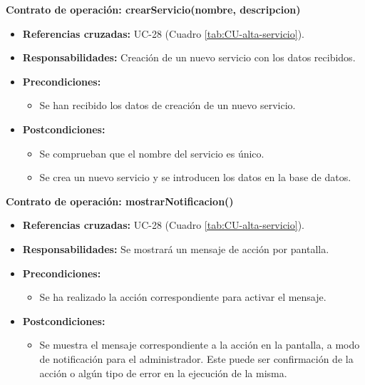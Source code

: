 \textbf{Contrato de operación: crearServicio(nombre, descripcion)}
\begin{itemize}
\item \textbf{Referencias cruzadas:} UC-28 (Cuadro \ref{tab:CU-alta-servicio}).
\item \textbf{Responsabilidades:} Creación de un nuevo servicio con los datos recibidos.
\item \textbf{Precondiciones:} 
 \begin{itemize}
\item Se han recibido los datos de creación de un nuevo servicio.
\end {itemize}
\item \textbf{Postcondiciones:} 
 \begin{itemize}
 \item Se comprueban que el nombre del servicio es único.
\item Se crea un nuevo servicio y se introducen los datos en la base de datos.
\end {itemize}
\end {itemize}

\textbf{Contrato de operación: mostrarNotificacion()}
\begin{itemize}
\item \textbf{Referencias cruzadas:} UC-28 (Cuadro \ref{tab:CU-alta-servicio}).
\item \textbf{Responsabilidades:} Se mostrará un mensaje de acción por pantalla.
\item \textbf{Precondiciones:} 
 \begin{itemize}
\item Se ha realizado la acción correspondiente para activar el mensaje.
\end {itemize}
\item \textbf{Postcondiciones:} 
 \begin{itemize}
\item Se muestra el mensaje correspondiente a la acción en la pantalla, a modo de notificación para el administrador. Este puede ser confirmación de la acción o algún tipo de error en la ejecución de la misma.
\end {itemize}
\end {itemize}


\vspace{10mm}

